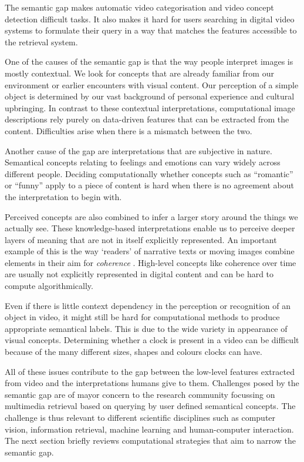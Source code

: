 The semantic gap makes automatic video categorisation and video concept detection difficult tasks\cite{Snoek:2009dq}. It also makes it hard for users searching in digital video systems to formulate their query in a way that matches the features accessible to the retrieval system.

One of the causes of the semantic gap is that the way people interpret images is mostly contextual\cite{Smeulders:2000tx}. We look for concepts that are already familiar from our environment or earlier encounters with visual content. Our perception of a simple object is determined by our vast background of personal experience and cultural upbringing. In contrast to these contextual interpretations, computational image descriptions rely purely on data-driven features that can be extracted from the content. Difficulties arise when there is a mismatch between the two.

Another cause of the gap are interpretations that are subjective in nature. Semantical concepts relating to feelings and emotions can vary widely across different people. Deciding computationally whether concepts such as ``romantic'' or ``funny'' apply to a piece of content is hard when there is no agreement about the interpretation to begin with.

Perceived concepts are also combined to infer a larger story around the things we actually see. These knowledge-based interpretations enable us to perceive deeper layers of meaning that are not in itself explicitly represented. An important example of this is the way `readers' of narrative texts or moving images combine elements in their aim for \emph{coherence}\cite[p.~38]{Bordwell:1985tz} \cite{gernsbacher1995coherence, Graesser:1994va}. High-level concepts like coherence over time are usually not explicitly represented in digital content and can be hard to compute algorithmically.

Even if there is little context dependency in the perception or recognition of an object in video, it might still be hard for computational methods to produce appropriate semantical labels. This is due to the wide variety in appearance of visual concepts. Determining whether a clock is present in a video can be difficult because of the many different sizes, shapes and colours clocks can have. 

All of these issues contribute to the gap between the low-level features extracted from video and the interpretations humans give to them. Challenges posed by the semantic gap are of mayor concern to the research community focussing on multimedia retrieval based on querying by user defined semantical concepts. The challenge is thus relevant to different scientific disciplines such as computer vision, information retrieval, machine learning and human-computer interaction. The next section briefly reviews computational strategies that aim to narrow the semantic gap.

